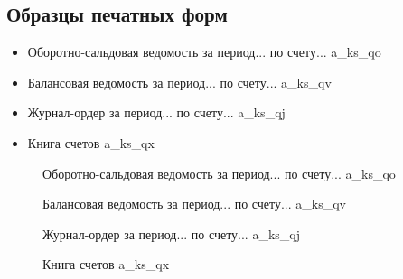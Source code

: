 \newpage

\subsection{Образцы печатных форм}

\begin{itemize}
    \item Оборотно-сальдовая ведомость за период... по счету... \gpiFIO\/a\_ks\_qo
    \item Балансовая ведомость за период... по счету...  \gpiFIO\/a\_ks\_qv
    \item Журнал-ордер за период... по счету... \gpiFIO\/a\_ks\_qj
    \item Книга счетов \gpiFIO\/a\_ks\_qx
\end{itemize}

\begin{figure}[h!]
    \centering
    \caption{Оборотно-сальдовая ведомость за период... по счету... \gpiFIO\/a\_ks\_qo}
\end{figure}

\begin{figure}[h!]
    \centering
    \caption{Балансовая ведомость за период... по счету... \gpiFIO\/a\_ks\_qv}
\end{figure}

\begin{figure}[h!]
    \centering
    \caption{Журнал-ордер за период... по счету... \gpiFIO\/a\_ks\_qj}
\end{figure}

\begin{figure}[h!]
    \centering
    \caption{Книга счетов  \gpiFIO\/a\_ks\_qx}
\end{figure}

\newpage
